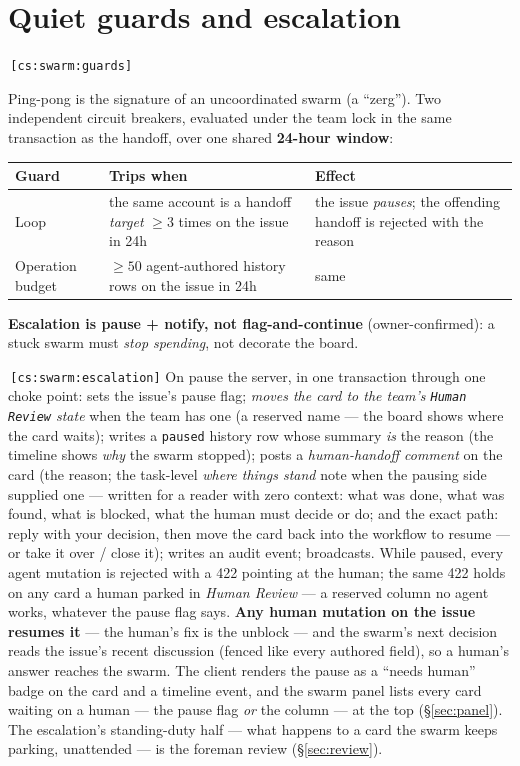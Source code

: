 \documentclass[11pt,a4paper]{report}
\newcommand{\cs}[1]{\,\texttt{\scriptsize[cs:#1]}\label{cs:#1}}
\begin{document}
\section{Quiet guards and escalation}
\label{sec:guards}
\cs{swarm:guards}

Ping-pong is the signature of an uncoordinated swarm (a ``zerg''). Two
independent circuit breakers, evaluated under the team lock in the same
transaction as the handoff, over one shared \textbf{24-hour window}:

\begin{center}
\begin{tabular}{@{}lp{}p{}@{}}
\toprule
\textbf{Guard} & \textbf{Trips when} & \textbf{Effect}\\
\midrule
Loop & the same account is a handoff \emph{target}
  $\ge 3$ times on the issue in 24h & the issue \emph{pauses}; the
  offending handoff is rejected with the reason\\
Operation budget & $\ge 50$ agent-authored history rows on the issue in
  24h & same\\
\bottomrule
\end{tabular}
\end{center}

\textbf{Escalation is pause + notify, not flag-and-continue}
(owner-confirmed): a stuck swarm must \emph{stop spending}, not decorate
the board.

\cs{swarm:escalation} On pause the server, in one transaction through
one choke point: sets the issue's pause flag; \emph{moves the card to the
team's \texttt{Human Review} state} when the team has one (a reserved
name --- the board shows where the card waits); writes a \texttt{paused}
history row whose summary \emph{is} the reason (the timeline shows
\emph{why} the swarm stopped); posts a \emph{human-handoff comment} on
the card (the reason; the task-level \emph{where things stand} note when
the pausing side supplied one --- written for a reader with zero context:
what was done, what was found, what is blocked, what the human must
decide or do; and the exact path: reply with your decision, then move
the card back into the workflow to resume --- or take it over / close
it); writes an audit event; broadcasts. While paused, every agent
mutation is rejected with a 422 pointing at the human; the same 422
holds on any card a human parked in \emph{Human Review} --- a reserved
column no agent works, whatever the pause flag says.
\textbf{Any human mutation on the issue resumes it} --- the human's fix
is the unblock --- and the swarm's next decision reads the issue's
recent discussion (fenced like every authored field), so a human's
answer reaches the swarm. The client renders the pause as a ``needs
human'' badge on the card and a timeline event, and the swarm panel
lists every card waiting on a human --- the pause flag
\emph{or} the column --- at the top (\S\ref{sec:panel}).
The escalation's standing-duty half --- what happens to a card the
swarm keeps parking, unattended --- is the foreman review
(\S\ref{sec:review}).
\end{document}
